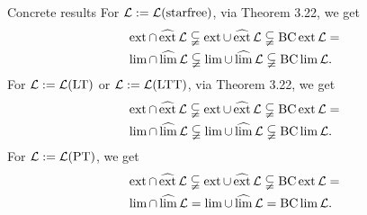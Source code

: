 \documentclass[
	notheorems,noamsthm]{beamer}
\begin{document}

\begin{frame}[<+->]{Concrete results}
For $\Lang := \Lang(\mathtext{starfree})$, via Theorem 3.22, we get
\begin{align*}
& \ext \cap \dext \Lang \subsetneqq
\ext \cup \dext \Lang \subsetneqq
\BC \ext \Lang = \\
& \lim \cap \dlim \Lang \subsetneqq
\lim \cup \dlim \Lang \subsetneqq
\BC \lim \Lang .
\end{align*}
For $\Lang := \Lang(\LT)$ or $\Lang := \Lang(\LTT)$, via Theorem 3.22, we get
\begin{align*}
& \ext \cap \dext \Lang \subsetneqq
\ext \cup \dext \Lang \subsetneqq
\BC \ext \Lang = \\
& \lim \cap \dlim \Lang \subsetneqq
\lim \cup \dlim \Lang \subsetneqq
\BC \lim \Lang .
\end{align*}
For $\Lang := \Lang(\PT)$, we get
\begin{align*}
& \ext \cap \dext \Lang \subsetneqq
\ext \cup \dext \Lang \subsetneqq
\BC \ext \Lang = \\
& \lim \cap \dlim \Lang =
\lim \cup \dlim \Lang =
\BC \lim \Lang .
\end{align*}
\end{frame}
\end{document}
